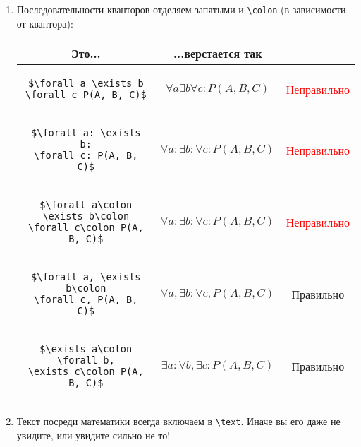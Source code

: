 \documentclass[12pt,a4paper]{book}
\newcommand{\ok}{& \textcolor{green!60!black}{Правильно}}
\newcommand{\bad}{& \textcolor{red}{Неправильно}}
\begin{document}
\begin{enumerate}
\item
	Последовательности кванторов отделяем запятыми и \verb'\colon' (в зависимости от квантора):
	\begin{center}\begin{tabular}{|c|c|c|}
		\hline Это... & ...верстается так & \\
		\hline \begin{minipage}{0.5\linewidth}\begin{verbatim}$\forall a \exists b
\forall c P(A, B, C)$\end{verbatim}\end{minipage}
		           & $\forall a \exists b \forall c: P(A, B, C)$ \bad \\
		\hline \begin{minipage}{0.5\linewidth}\begin{verbatim}$\forall a: \exists b:
\forall c: P(A, B, C)$\end{verbatim}\end{minipage}
		           & $\forall a: \exists b: \forall c: P(A, B, C)$ \bad \\
		\hline \begin{minipage}{0.5\linewidth}\begin{verbatim}$\forall a\colon \exists b\colon
\forall c\colon P(A, B, C)$\end{verbatim}\end{minipage}
		           & $\forall a\colon \exists b\colon \forall c\colon P(A, B, C)$ \bad \\
		\hline \begin{minipage}{0.5\linewidth}\begin{verbatim}$\forall a, \exists b\colon
\forall c, P(A, B, C)$\end{verbatim}\end{minipage}
		           & $\forall a, \exists b\colon \forall c, P(A, B, C)$ \ok \\
		\hline \begin{minipage}{0.5\linewidth}\begin{verbatim}$\exists a\colon \forall b,
\exists c\colon P(A, B, C)$\end{verbatim}\end{minipage}
		           & $\exists a\colon \forall b, \exists c\colon P(A, B, C)$ \ok \\
		\hline
	\end{tabular}\end{center}

\item
	Текст посреди математики всегда включаем в \verb'\text'.
	Иначе вы его даже не увидите, или увидите сильно не то!


\end{enumerate}
\end{document}
